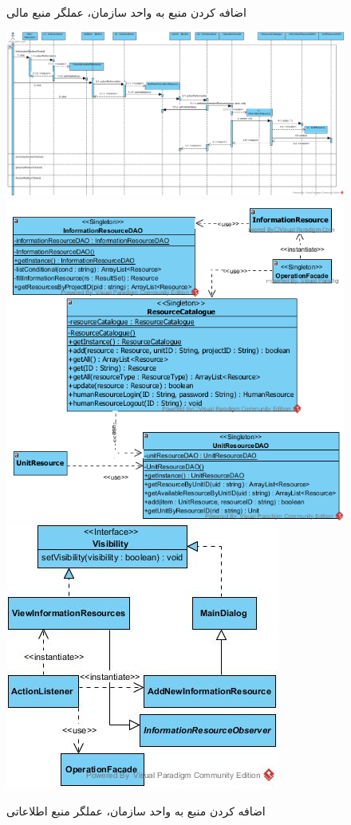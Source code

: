 \begin{landscape}
\begin{figure}[H]
	\caption{اضافه کردن منبع به واحد سازمان، عملگر منبع مالی}
\end{figure}
\begin{figure}[H]
	\centering
	\includegraphics[scale=0.5]{img/sequence-design/AddResourceToUnit_INFORMATION}
	\includegraphics[scale=0.5]{img/sequence-design/AddResourceToUnit_INFORMATIONC}
	\includegraphics[scale=0.5]{img/sequence-design/AddResourceToUnit_INFORMATIONUI}
	\caption{اضافه کردن منبع به واحد سازمان، عملگر منبع اطلاعاتی}
\end{figure}


\end{landscape}
